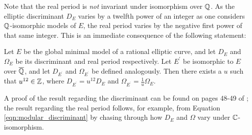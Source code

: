 \documentclass[10pt]{article}
\newcommand{\pr}{^{\prime}}
\begin{document}
Note that the real period is {\it not} invariant under isomorphism over $\mathbb{Q}$. As the elliptic discriminant $D_E$ varies by a twelfth power of an integer as one considers $\mathbb{Q}$-isomorphic models of $E$, the real period varies by the negative first power of that same integer. This is an immediate consequence of the following statement:
\begin{lemma}
Let $E$ be the global minimal model of a rational elliptic curve, and let $D_E$ and $\Omega_E$ be its discriminant and real period respectively. Let $E\pr$ be isomorphic to $E$ over $\overline{\mathbb{Q}}$, and let $D_{E^{\pr}}$ and $\Omega_{E^{\pr}}$ be defined analogously. Then there exists a $u$ such that  $u^{12}\in \mathbb{Z}$, where $D_{E^{\pr}}=u^{12} D_E$ and $\Omega_{E^{\pr}}=\frac{1}{u}\Omega_E$.
\end{lemma}
A proof of the result regarding the discriminant can be found on pages 48-49 of \cite{Sil-1985}; the result regarding the real period follows, for example, from Equation \ref{eqn:modular_discriminant} by chasing through how $D_E$ and $\Omega$ vary under $\mathbb{C}$-isomorphism. \\
\end{document}
